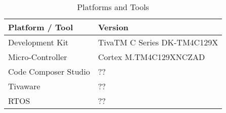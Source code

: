 \begin{table}[H]
	\begin{tabularx}{\textwidth}{l | X}
		Platform / Tool & Version \\
		\hline
		Development Kit & TivaTM C Series DK-TM4C129X\\
		\hline
		Micro-Controller & Cortex M.TM4C129XNCZAD\\
		\hline
		Code Composer Studio & ??\\
		\hline
		Tivaware & ??\\
		\hline
		RTOS & ??\\
	\end{tabularx}
	\caption{Platforms and Tools}
	\label{tab:PlatformsAndTools}
\end{table}